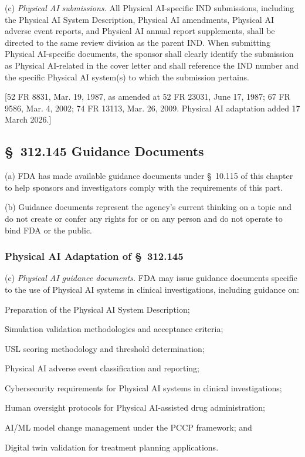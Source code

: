\documentclass[11pt]{article}
\begin{document}
(c) \textit{Physical AI submissions.} All Physical AI-specific IND submissions, including the Physical AI System Description, Physical AI amendments, Physical AI adverse event reports, and Physical AI annual report supplements, shall be directed to the same review division as the parent IND. When submitting Physical AI-specific documents, the sponsor shall clearly identify the submission as Physical AI-related in the cover letter and shall reference the IND number and the specific Physical AI system(s) to which the submission pertains.

[52 FR 8831, Mar. 19, 1987, as amended at 52 FR 23031, June 17, 1987; 67 FR 9586, Mar. 4, 2002; 74 FR 13113, Mar. 26, 2009. Physical AI adaptation added 17 March 2026.]

\subsection{\S~312.145 Guidance Documents}

(a) FDA has made available guidance documents under \S~10.115 of this chapter to help sponsors and investigators comply with the requirements of this part.

(b) Guidance documents represent the agency's current thinking on a topic and do not create or confer any rights for or on any person and do not operate to bind FDA or the public.

\subsubsection{Physical AI Adaptation of \S~312.145}

(c) \textit{Physical AI guidance documents.} FDA may issue guidance documents specific to the use of Physical AI systems in clinical investigations, including guidance on:

\begin{description}[leftmargin=0.8cm,style=sameline]
\item[(i)] Preparation of the Physical AI System Description;
\item[(ii)] Simulation validation methodologies and acceptance criteria;
\item[(iii)] USL scoring methodology and threshold determination;
\item[(iv)] Physical AI adverse event classification and reporting;
\item[(v)] Cybersecurity requirements for Physical AI systems in clinical investigations;
\item[(vi)] Human oversight protocols for Physical AI-assisted drug administration;
\item[(vii)] AI/ML model change management under the PCCP framework; and
\item[(viii)] Digital twin validation for treatment planning applications.
\end{description}
\end{document}
